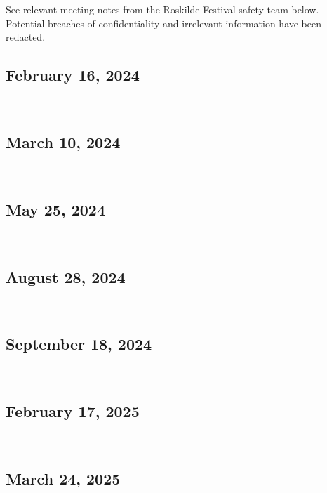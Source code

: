 See relevant meeting notes from the Roskilde Festival safety team below. Potential breaches of confidentiality and irrelevant information have been redacted.

\subsection{February 16, 2024}
\label{appendix:rf-feb-24}
\


\subsection{March 10, 2024}
\label{appendix:rf-mar-24}
\


\subsection{May 25, 2024}
\label{appendix:rf-may-24}
\


\subsection{August 28, 2024}
\label{appendix:rf-aug-24}
\


\subsection{September 18, 2024}
\label{appendix:rf-sep-24}
\


\subsection{February 17, 2025}
\label{appendix:rf-feb-25}
\


\subsection{March 24, 2025}
\label{appendix:rf-mar-25}
\


